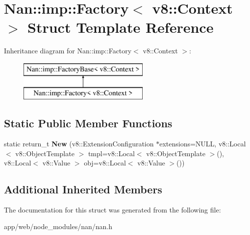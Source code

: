 \hypertarget{struct_nan_1_1imp_1_1_factory_3_01v8_1_1_context_01_4}{}\section{Nan\+:\+:imp\+:\+:Factory$<$ v8\+:\+:Context $>$ Struct Template Reference}
\label{struct_nan_1_1imp_1_1_factory_3_01v8_1_1_context_01_4}
Inheritance diagram for Nan\+:\+:imp\+:\+:Factory$<$ v8\+:\+:Context $>$\+:\begin{figure}[H]
\begin{center}
\leavevmode
\includegraphics[height=2.000000cm]{struct_nan_1_1imp_1_1_factory_3_01v8_1_1_context_01_4}
\end{center}
\end{figure}
\subsection*{Static Public Member Functions}
\begin{DoxyCompactItemize}
\item 
\mbox{\label{struct_nan_1_1imp_1_1_factory_3_01v8_1_1_context_01_4_a5881a6029fa44fccfdbd896744a31190}} 
static return\+\_\+t {\bfseries New} (v8\+::\+Extension\+Configuration $\ast$extensions=N\+U\+LL, v8\+::\+Local$<$ v8\+::\+Object\+Template $>$ tmpl=v8\+::\+Local$<$ v8\+::\+Object\+Template $>$(), v8\+::\+Local$<$ v8\+::\+Value $>$ obj=v8\+::\+Local$<$ v8\+::\+Value $>$())
\end{DoxyCompactItemize}
\subsection*{Additional Inherited Members}


The documentation for this struct was generated from the following file\+:\begin{DoxyCompactItemize}
\item 
app/web/node\+\_\+modules/nan/nan.\+h\end{DoxyCompactItemize}

